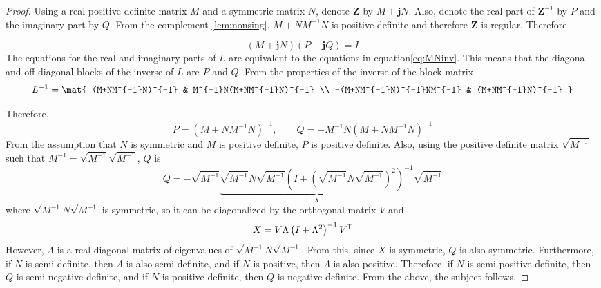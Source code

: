 \documentclass[graybox, envcountchap]{svmult}
\begin{document}
\begin{proof}
Using a real positive definite matrix $M$ and a symmetric matrix $N$, denote $\bm{Z}$ by $M+ \bm{j} N$.
Also, denote the real part of $\bm{Z}^{-1}$ by $P$ and the imaginary part by $Q$.
From the complement \ref{lem:nonsing}, $M+NM^{-1}N$ is positive definite and therefore $\bm{Z}$ is regular.
Therefore

\[
(M+ \bm{j} N)(P+ \bm{j} Q)=I
\]
The equations for the real and imaginary parts of $L$ are equivalent to the equations in equation\ref{eq:MNinv}.
This means that the diagonal and off-diagonal blocks of the inverse of $L$ are $P$ and $Q$.
From the properties of the inverse of the block matrix
\begin{equation*}
L^{-1}=
\mat{
(M+NM^{-1}N)^{-1} & M^{-1}N(M+NM^{-1}N)^{-1} \\
-(M+NM^{-1}N)^{-1}NM^{-1} & (M+NM^{-1}N)^{-1}
}
\end{equation*}

Therefore,
\begin{equation*}
P=(M+NM^{-1}N)^{-1},\qquad
Q=-M^{-1}N(M+NM^{-1}N)^{-1}
\end{equation*}
From the assumption that $N$ is symmetric and $M$ is positive definite, $P$ is positive definite.
Also, using the positive definite matrix $\sqrt{M^{-1}}$ such that $M^{-1}=\sqrt{M^{-1}}\sqrt{M^{-1}}$, $Q$ is
\begin{equation*}
Q=-\sqrt{M^{-1}} 
\underbrace{
\sqrt{M^{-1}} N \sqrt{M^{-1}}
\left(
I + (\sqrt{M^{-1}} N \sqrt{M^{-1}} )^2
\right)^{-1}
}_{X}
\sqrt{M^{-1}}
\end{equation*}
where $\sqrt{M^{-1}} N \sqrt{M^{-1}}$ is symmetric, so it can be diagonalized by the orthogonal matrix $V$ and
\begin{equation*}
X = V \Lambda \left(
I + \Lambda^2
\right)^{-1}
V^{\sf T}
\end{equation*}
However, $\Lambda$ is a real diagonal matrix of eigenvalues of $\sqrt{M^{-1}} N \sqrt{M^{-1}}$.
From this, since $X$ is symmetric, $Q$ is also symmetric.
Furthermore, if $N$ is semi-definite, then $\Lambda$ is also semi-definite, and if $N$ is positive, then $\Lambda$ is also positive.
Therefore, if $N$ is semi-positive definite, then $Q$ is semi-negative definite, and if $N$ is positive definite, then $Q$ is negative definite.
From the above, the subject follows.
\end{proof}
\end{document}
